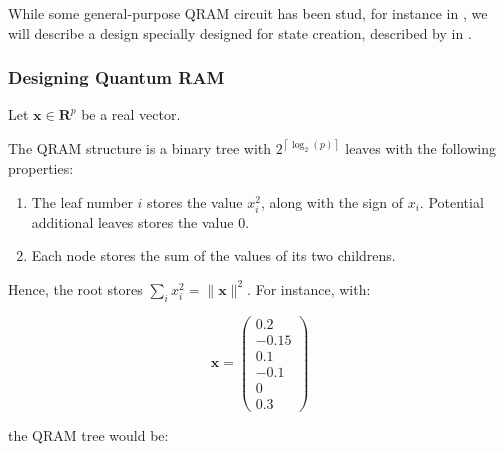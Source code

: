 \documentclass[11pt, a4paper]{article}
\begin{document}
            While some general-purpose QRAM circuit has been stud, for instance in \cite{QRAMCircuit}, we will describe a design specially designed for state creation, described by \citeauthor{Prakash} in \cite{Prakash}.
            
            \subsubsection{Designing Quantum RAM}
                \label{subsubsec:QRAM}
                Let \(\mathbf{x}\in\mathbf{R}^p\) be a real vector.
                
                The QRAM structure is a binary tree with \(2^{\left\lceil\log_2(p)\right\rceil}\) leaves with the following properties:
                
                \begin{enumerate}
                    \item The leaf number \(i\) stores the value \(x_i^2\), along with the sign of \(x_i\). Potential additional leaves stores the value \(0\). 
                    \item Each node stores the sum of the values of its two childrens.
                \end{enumerate}
                
                Hence, the root stores \(\sum_ix_i^2=\|\mathbf{x}\|^2\). For instance, with:
                
                \[\mathbf{x}=\begin{pmatrix}0.2\\-0.15\\0.1\\ -0.1\\0\\0.3\end{pmatrix}\]
                
                the QRAM tree would be:
                
\end{document}
